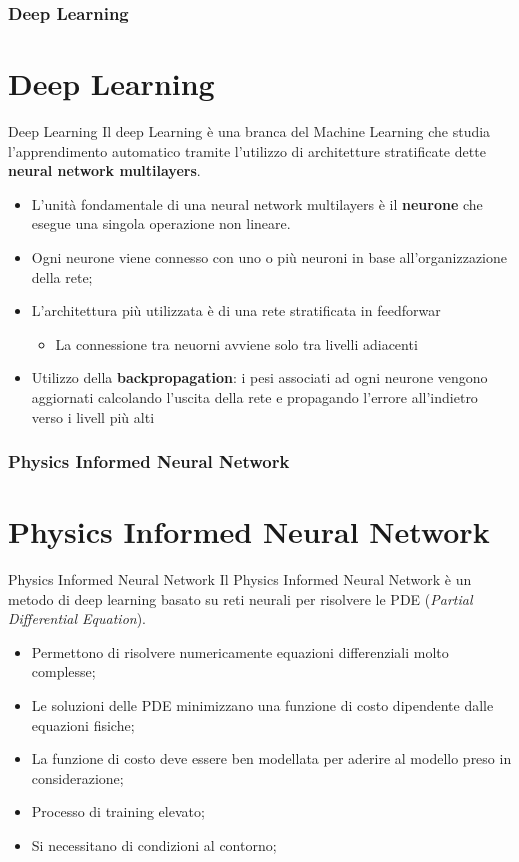 \documentclass{beamer}
\begin{document}
\begin{frame}
	\frametitle{Deep Learning}
	\section{Deep Learning}
	\begin{block}{Deep Learning}
		Il deep Learning è una branca del Machine Learning che studia l'apprendimento automatico tramite l'utilizzo di architetture stratificate dette \textbf{neural  network multilayers}.
	\end{block}
	\begin{itemize}
		\item L'unità fondamentale di una neural network multilayers è il \textbf{neurone} che esegue una singola operazione non lineare.
		\item Ogni neurone viene connesso con uno o più neuroni in base all'organizzazione della rete;
		\item L'architettura più utilizzata è di una rete stratificata in feedforwar\begin{itemize}
			\item La connessione tra neuorni avviene solo tra livelli adiacenti
		\end{itemize}
		\item Utilizzo della \textbf{backpropagation}: i pesi associati ad ogni neurone vengono aggiornati calcolando l'uscita della rete e propagando l'errore all'indietro verso i livell più alti
	\end{itemize}
\end{frame}
\begin{frame}
	\frametitle{Physics Informed Neural Network}
	\section{Physics Informed Neural Network}
	\begin{block}{Physics Informed Neural Network}
		Il Physics Informed Neural Network è un metodo di deep learning basato su reti neurali per risolvere le PDE (\emph{Partial Differential Equation}).
	\end{block}
	\begin{itemize}
		\item Permettono di risolvere numericamente equazioni differenziali molto complesse;
		\item Le soluzioni delle PDE minimizzano una funzione di costo dipendente dalle equazioni fisiche;
		\item La funzione di costo deve essere ben modellata per aderire al modello preso in considerazione;
		\item Processo di training elevato;
		\item Si necessitano di condizioni al contorno;
	\end{itemize}
\end{frame}
\end{document}
